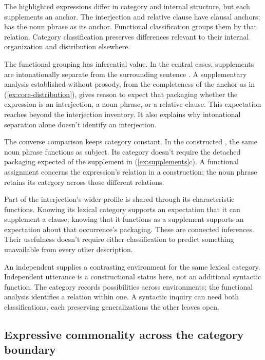 \documentclass[12pt]{article}
\begin{document}
The highlighted expressions differ in category and internal structure,
but each supplements an anchor. The interjection and relative clause
have clausal anchors;  has the noun phrase
 as its anchor. Functional classification
groups them by that relation. Category classification preserves differences
relevant to their internal organization and distribution elsewhere.

The functional grouping has inferential value. In the central cases,
supplements are intonationally separate from the surrounding sentence
\citep[1350]{HuddlestonPullum2002}. A supplementary analysis established
without prosody, from the completeness of the anchor as in
(\ref{ex:core-distribution}), gives reason to expect that packaging whether the expression
is an interjection, a noun phrase, or a relative clause. This
expectation reaches beyond the interjection inventory. It also explains
why intonational separation alone doesn't identify an interjection.

The converse comparison keeps category constant. In the constructed
, the same noun phrase
functions as subject. Its category doesn't require the detached packaging
expected of the supplement in (\ref{ex:supplements}c). A functional
assignment concerns the expression's relation in a construction; the
noun phrase retains its category across those different relations.

Part of the interjection's wider profile is shared through its
characteristic functions. Knowing its lexical category supports an expectation
that it can supplement a clause; knowing that it functions as a
supplement supports an expectation about that occurrence's packaging.
These are connected inferences. Their usefulness doesn't require either
classification to predict something unavailable from every other description.

An independent  supplies a contrasting environment for
the same lexical category. Independent utterance is a constructional
status here, not an additional syntactic function. The category records
possibilities across environments; the functional analysis identifies a
relation within one. A syntactic inquiry can need both classifications,
each preserving generalizations the other leaves open.

\subsection{Expressive commonality across the category boundary}\label{sec:damn-profiles}
\end{document}
